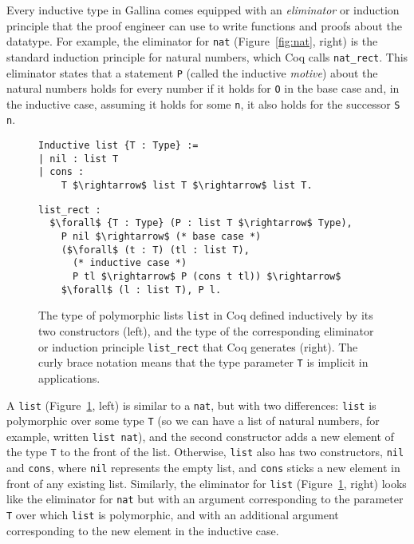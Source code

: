 Every inductive type in Gallina comes equipped with an \textit{eliminator} or induction principle
that the proof engineer can use to write functions and proofs about the datatype.
For example, the eliminator for \lstinline{nat} (Figure~\ref{fig:nat}, right) is the standard induction principle for natural numbers,
which Coq calls \lstinline{nat_rect}. %
This eliminator states that a statement \lstinline{P} (called the inductive \textit{motive}) about the natural numbers
holds for every number if it holds for \lstinline{O} in the base case and, in the inductive case,
assuming it holds for some \lstinline{n}, it also holds for the successor \lstinline{S n}.

\begin{figure}
\begin{minipage}{0.44\textwidth}
\begin{lstlisting}
Inductive list {T : Type} :=
| nil : list T
| cons :
    T $\rightarrow$ list T $\rightarrow$ list T.
\end{lstlisting}
\end{minipage}
\hfill
\begin{minipage}{0.54\textwidth}
\begin{lstlisting}
list_rect :
  $\forall$ {T : Type} (P : list T $\rightarrow$ Type),
    P nil $\rightarrow$ (* base case *)
    ($\forall$ (t : T) (tl : list T),
      (* inductive case *)
      P tl $\rightarrow$ P (cons t tl)) $\rightarrow$
    $\forall$ (l : list T), P l.
\end{lstlisting}
\end{minipage}
\caption{The type of polymorphic lists \lstinline{list} in Coq defined inductively by its two constructors (left), and the type of the corresponding eliminator or induction principle \lstinline{list_rect} that Coq generates (right). The curly brace notation means that the type parameter \lstinline{T} is implicit in applications.}
\label{fig:list}
\end{figure}


A \lstinline{list} (Figure~\ref{fig:list}, left) is similar to a \lstinline{nat}, 
but with two differences: \lstinline{list} is polymorphic over some type \lstinline{T} (so we can have a list of natural numbers,
for example, written \lstinline{list nat}), and the second constructor adds a new element of the type \lstinline{T} to the front of the list.
Otherwise, \lstinline{list} also has two constructors, \lstinline{nil} and \lstinline{cons}, where \lstinline{nil} represents the empty list,
and \lstinline{cons} sticks a new element in front of any existing list.
Similarly, the eliminator for \lstinline{list} (Figure~\ref{fig:list}, right) looks like the eliminator for \lstinline{nat} 
but with an argument corresponding to the parameter \lstinline{T} over which \lstinline{list} is polymorphic,
and with an additional argument corresponding to the new element in the inductive case.

